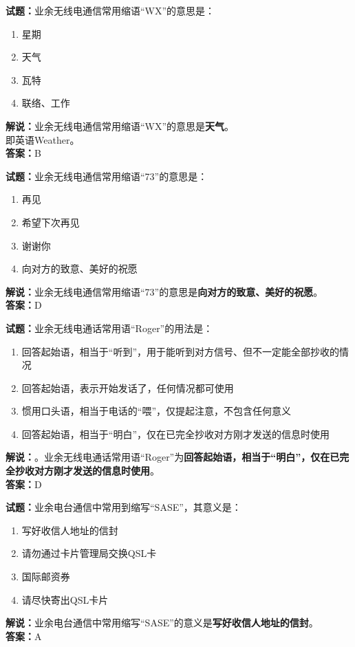 \documentclass{ctexbook}
\begin{document}
\bigskip


\noindent\textbf{试题：}业余无线电通信常用缩语“WX”的意思是：
\begin{enumerate}[leftmargin=3em]
\item 星期
\item 天气
\item 瓦特
\item 联络、工作
\end{enumerate}
\noindent\textbf{解说：}业余无线电通信常用缩语“WX”的意思是\textbf{天气}。\\即英语Weather。\\\noindent\textbf{答案：}B


\bigskip


\noindent\textbf{试题：}业余无线电通信常用缩语“73”的意思是：
\begin{enumerate}[leftmargin=3em]
\item 再见
\item 希望下次再见
\item 谢谢你
\item 向对方的致意、美好的祝愿
\end{enumerate}
\noindent\textbf{解说：}业余无线电通信常用缩语“73”的意思是\textbf{向对方的致意、美好的祝愿}。\\\noindent\textbf{答案：}D



\bigskip


\noindent\textbf{试题：}业余无线电通话常用语“Roger”的用法是：
\begin{enumerate}[leftmargin=3em]
\item 回答起始语，相当于“听到”，用于能听到对方信号、但不一定能全部抄收的情况
\item 回答起始语，表示开始发话了，任何情况都可使用
\item 惯用口头语，相当于电话的“喂”，仅提起注意，不包含任何意义
\item 回答起始语，相当于“明白”，仅在已完全抄收对方刚才发送的信息时使用
\end{enumerate}
\noindent\textbf{解说：}。业余无线电通话常用语“Roger”为\textbf{回答起始语，相当于“明白”，仅在已完全抄收对方刚才发送的信息时使用}。\\\noindent\textbf{答案：}D


\bigskip


\noindent\textbf{试题：}业余电台通信中常用到缩写“SASE”，其意义是：
\begin{enumerate}[leftmargin=3em]
\item 写好收信人地址的信封
\item 请勿通过卡片管理局交换QSL卡
\item 国际邮资券
\item 请尽快寄出QSL卡片
\end{enumerate}
\noindent\textbf{解说：}业余电台通信中常用缩写“SASE”的意义是\textbf{写好收信人地址的信封}。\\\noindent\textbf{答案：}A
\end{document}

